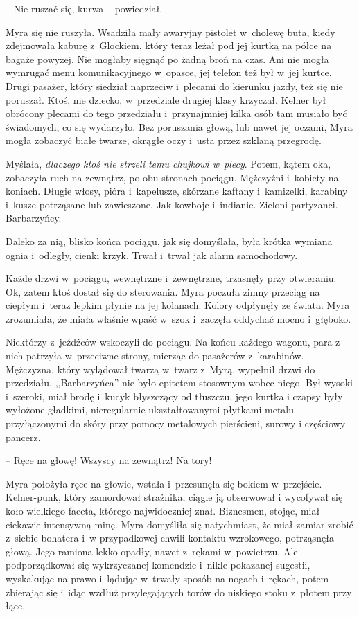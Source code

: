 \documentclass[oneside,polish,11pt,sfheadings]{mwbk}
\begin{document}
-- Nie ruszać się, kurwa -- powiedział.

Myra się nie ruszyła. Wsadziła mały awaryjny pistolet w~cholewę buta,
kiedy zdejmowała kaburę z~Glockiem, który teraz leżał pod jej kurtką na
półce na bagaże powyżej. Nie mogłaby sięgnąć po żadną broń na czas. Ani
nie mogła wymrugać menu komunikacyjnego w~opasce, jej telefon też był w~jej kurtce. Drugi pasażer, który siedział naprzeciw i~plecami do
kierunku jazdy, też się nie poruszał. Ktoś, nie dziecko, w~przedziale
drugiej klasy krzyczał. Kelner był obrócony plecami do tego przedziału i~przynajmniej kilka osób tam musiało być świadomych, co się wydarzyło.
Bez poruszania głową, lub nawet jej oczami, Myra mogła zobaczyć białe
twarze, okrągłe oczy i~usta przez szklaną przegrodę.

Myślała, \textit{dlaczego ktoś nie strzeli temu chujkowi w~plecy}. Potem,
kątem oka, zobaczyła ruch na zewnątrz, po obu stronach pociągu.
Mężczyźni i~kobiety na koniach. Długie włosy, pióra i~kapelusze,
skórzane kaftany i~kamizelki, karabiny i~kusze potrząsane lub
zawieszone. Jak kowboje i~indianie. Zieloni partyzanci. Barbarzyńcy.

Daleko za nią, blisko końca pociągu, jak się domyślała, była krótka
wymiana ognia i~odległy, cienki krzyk. Trwał i~trwał jak alarm
samochodowy.

Każde drzwi w~pociągu, wewnętrzne i~zewnętrzne, trzasnęły przy
otwieraniu. Ok, zatem ktoś dostał się do sterowania. Myra poczuła zimny
przeciąg na ciepłym i~teraz lepkim płynie na jej kolanach. Kolory
odpłynęły ze świata. Myra zrozumiała, że miała właśnie wpaść w~szok i~zaczęła oddychać mocno i~głęboko.

Niektórzy z~jeźdźców wskoczyli do pociągu. Na końcu każdego wagonu, para
z nich patrzyła w~przeciwne strony, mierząc do pasażerów z~karabinów.
Mężczyzna, który wylądował twarzą w~twarz z~Myrą, wypełnił drzwi do
przedziału. ,,Barbarzyńca'' nie było epitetem stosownym wobec niego. Był
wysoki i~szeroki, miał brodę i~kucyk błyszczący od tłuszczu, jego kurtka
i czapsy były wyłożone gładkimi, nieregularnie ukształtowanymi płytkami
metalu przyłączonymi do skóry przy pomocy metalowych pierścieni, surowy
i częściowy pancerz.

-- Ręce na głowę! Wszyscy na zewnątrz! Na tory!

Myra położyła ręce na głowie, wstała i~przesunęła się bokiem w~przejście. Kelner-punk, który zamordował strażnika, ciągle ją obserwował
i wycofywał się koło wielkiego faceta, którego najwidoczniej znał.
Biznesmen, stojąc, miał ciekawie intensywną minę. Myra domyśliła się
natychmiast, że miał zamiar zrobić z~siebie bohatera i~w przypadkowej
chwili kontaktu wzrokowego, potrząsnęła głową. Jego ramiona lekko
opadły, nawet z~rękami w~powietrzu. Ale podporządkował się wykrzyczanej
komendzie i~nikle pokazanej sugestii, wyskakując na prawo i~lądując w~trwały sposób na nogach i~rękach, potem zbierając się i~idąc wzdłuż
przylegających torów do niskiego stoku z~płotem przy łące.
\end{document}
